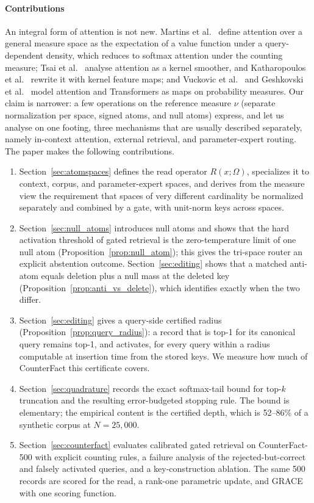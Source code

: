 \documentclass[preprint,12pt]{elsarticle}
\newcommand{\Om}{\Omega}
\begin{document}
\paragraph{Contributions}
An integral form of attention is not new. Martins et al.~\cite{martins2020sparse} define attention over a general measure space as the expectation of a value function under a query-dependent density, which reduces to softmax attention under the counting measure; Tsai et al.~\cite{tsai2019transformer} analyse attention as a kernel smoother, and Katharopoulos et al.~\cite{katharopoulos2020transformers} rewrite it with kernel feature maps; and Vuckovic et al.~\cite{vuckovic2020mathematical} and Geshkovski et al.~\cite{geshkovski2025mathematical} model attention and Transformers as maps on probability measures. Our claim is narrower: a few operations on the reference measure $\nu$ (separate normalization per space, signed atoms, and null atoms) express, and let us analyse on one footing, three mechanisms that are usually described separately, namely in-context attention, external retrieval, and parameter-expert routing. The paper makes the following contributions.
\begin{enumerate}[leftmargin=*,label=(\roman*)]
\item Section~\ref{sec:atomspaces} defines the read operator $R(x;\Om)$, specializes it to context, corpus, and parameter-expert spaces, and derives from the measure view the requirement that spaces of very different cardinality be normalized separately and combined by a gate, with unit-norm keys across spaces.
\item Section~\ref{sec:null_atoms} introduces null atoms and shows that the hard activation threshold of gated retrieval is the zero-temperature limit of one null atom (Proposition~\ref{prop:null_atom}); this gives the tri-space router an explicit abstention outcome. Section~\ref{sec:editing} shows that a matched anti-atom equals deletion plus a null mass at the deleted key (Proposition~\ref{prop:anti_vs_delete}), which identifies exactly when the two differ.
\item Section~\ref{sec:editing} gives a query-side certified radius (Proposition~\ref{prop:query_radius}): a record that is top-1 for its canonical query remains top-1, and activates, for every query within a radius computable at insertion time from the stored keys. We measure how much of CounterFact this certificate covers.
\item Section~\ref{sec:quadrature} records the exact softmax-tail bound for top-$k$ truncation and the resulting error-budgeted stopping rule. The bound is elementary; the empirical content is the certified depth, which is 52--86\% of a synthetic corpus at $N=25{,}000$.
\item Section~\ref{sec:counterfact} evaluates calibrated gated retrieval on CounterFact-500 with explicit counting rules, a failure analysis of the rejected-but-correct and falsely activated queries, and a key-construction ablation. The same 500 records are scored for the read, a rank-one parametric update, and GRACE \cite{hartvigsen2023aging} with one scoring function.
\end{enumerate}
\end{document}

